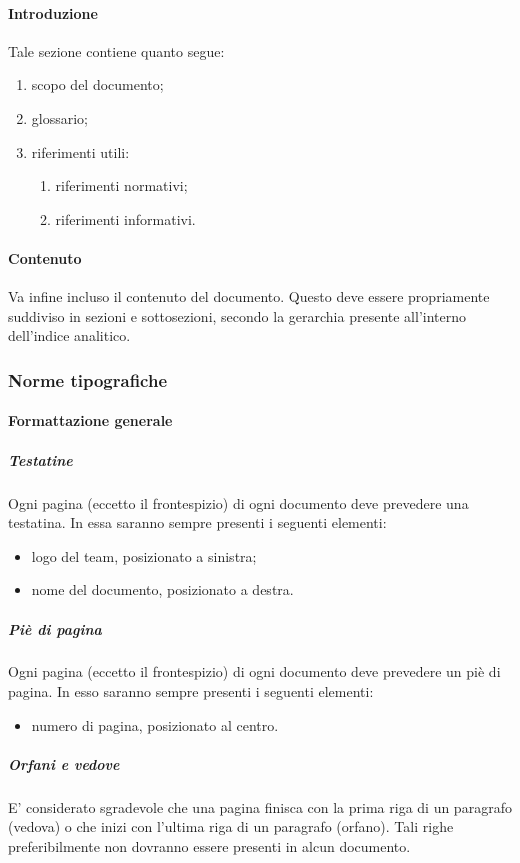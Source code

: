 			\paragraph{Introduzione}
				Tale sezione contiene quanto segue:
				\begin{enumerate}
					\item scopo del documento;
					\item glossario;
					\item riferimenti utili:
					\begin{enumerate}
						\item riferimenti normativi;
						\item riferimenti informativi.
					\end{enumerate}
				\end{enumerate}
			\paragraph{Contenuto}
				Va infine incluso il contenuto del documento. Questo deve essere propriamente suddiviso in sezioni e sottosezioni, secondo la gerarchia presente all’interno dell’indice analitico.
		\subsubsection{Norme tipografiche}
			\paragraph{Formattazione generale}
				\subparagraph{Testatine}
					Ogni pagina (eccetto il frontespizio) di ogni documento deve prevedere una testatina. In essa saranno sempre presenti i seguenti elementi:
					\begin{itemize}
						\item logo del team, posizionato a sinistra;
						\item nome del documento, posizionato a destra.
					\end{itemize}
				\subparagraph{Piè di pagina}
					Ogni pagina (eccetto il frontespizio) di ogni documento deve prevedere un piè di pagina. In esso saranno sempre presenti i seguenti elementi:
					\begin{itemize}
						\item numero di pagina, posizionato al centro.
					\end{itemize}
				\subparagraph{Orfani e vedove}
					E’ considerato sgradevole che una pagina finisca con la prima riga di un paragrafo (vedova) o che inizi con l’ultima riga di un paragrafo (orfano). Tali righe preferibilmente non dovranno essere presenti in alcun documento.
